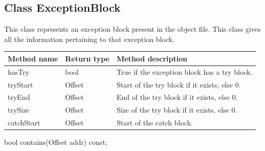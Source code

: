 \subsection{Class ExceptionBlock}\label{ExceptionBlock}


This class represents an exception block present in the object file. This class gives all the information pertaining to that exception block.

\begin{tabularx}{\textwidth}{llX}
\toprule
Method name & Return type & Method description \\
\midrule
hasTry & bool & True if the exception block has a try block. \\
tryStart & Offset & Start of the try block if it exists, else 0. \\
tryEnd & Offset & End of the try block if it exists, else 0. \\
trySize & Offset & Size of the try block if it exists, else 0. \\
catchStart & Offset & Start of the catch block. \\
\bottomrule
\end{tabularx}


\begin{apient}
bool contains(Offset addr) const;
\end{apient}

